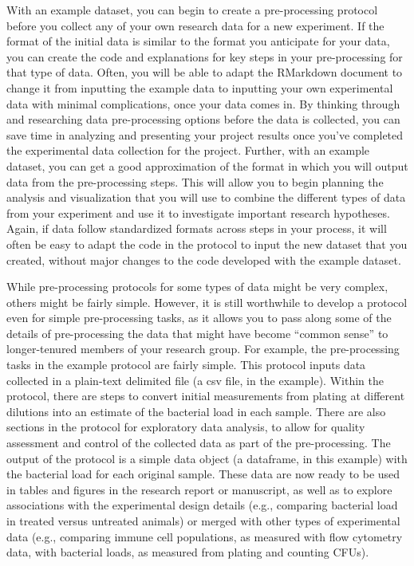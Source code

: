 \documentclass[]{tufte-book}
\begin{document}
With an example dataset, you can begin to create a pre-processing protocol
before you collect any of your own research data for a new experiment. If the
format of the initial data is similar to the format you anticipate for your
data, you can create the code and explanations for key steps in your
pre-processing for that type of data. Often, you will be able to adapt the
RMarkdown document to change it from inputting the example data to inputting
your own experimental data with minimal complications, once your data comes in.
By thinking through and researching data pre-processing options before the data
is collected, you can save time in analyzing and presenting your project results
once you've completed the experimental data collection for the project. Further,
with an example dataset, you can get a good approximation of the format in which
you will output data from the pre-processing steps. This will allow you to begin
planning the analysis and visualization that you will use to combine the
different types of data from your experiment and use it to investigate important
research hypotheses. Again, if data follow standardized formats across steps in
your process, it will often be easy to adapt the code in the protocol to input
the new dataset that you created, without major changes to the code developed
with the example dataset.

While pre-processing protocols for some types of data might be very complex,
others might be fairly simple. However, it is still worthwhile to develop a
protocol even for simple pre-processing tasks, as it allows you to pass along
some of the details of pre-processing the data that might have become ``common
sense'' to longer-tenured members of your research group. For example, the
pre-processing tasks in the example protocol are fairly simple. This protocol
inputs data collected in a plain-text delimited file (a csv file, in the
example). Within the protocol, there are steps to convert initial measurements
from plating at different dilutions into an estimate of the bacterial load in
each sample. There are also sections in the protocol for exploratory data
analysis, to allow for quality assessment and control of the collected data as
part of the pre-processing. The output of the protocol is a simple data object (a
dataframe, in this example) with the bacterial load for each original sample.
These data are now ready to be used in tables and figures in the research report
or manuscript, as well as to explore associations with the experimental design
details (e.g., comparing bacterial load in treated versus untreated animals) or
merged with other types of experimental data (e.g., comparing immune cell
populations, as measured with flow cytometry data, with bacterial loads, as
measured from plating and counting CFUs).
\end{document}
